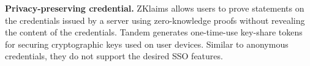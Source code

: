 \noindent\textbf{Privacy-preserving credential.}
ZKlaims \cite{zklaim} allows users to prove statements on the credentials issued by a server using zero-knowledge proofs without revealing the content of the credentials. 
Tandem \cite{tandem} generates one-time-use key-share tokens for securing cryptographic keys used on user devices. %
Similar to anonymous credentials, they do not support the desired SSO features. 




